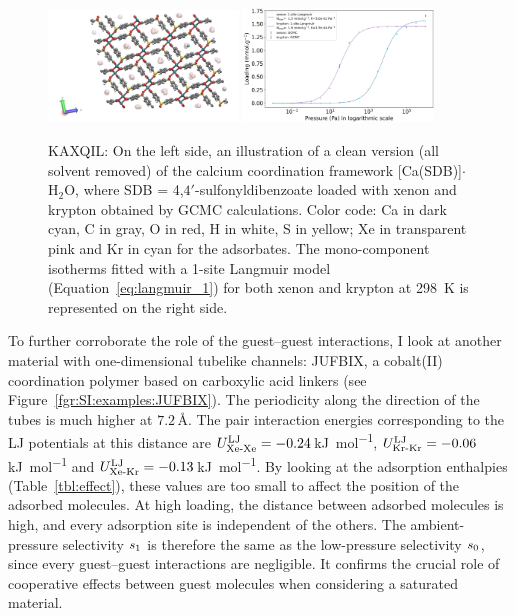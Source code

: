 \documentclass[main.tex]{subfiles}
\begin{document}
\begin{figure}[ht]
  \centering
    \includegraphics[width=0.45\textwidth]{figures/2-thermo/KAXQIL_clean.jpg}
    \includegraphics[width=0.45\textwidth]{figures/2-thermo/KAXQIL_clean_isotherm_xenon_krypton_298K.jpg}
    \caption{KAXQIL: On the left side, an illustration of a clean version (all solvent removed) of the calcium coordination framework [Ca(SDB)]$\cdot$H$_2$O, where SDB = 4,$4'$-sulfonyldibenzoate loaded with xenon and krypton obtained by GCMC calculations. Color code: Ca in dark cyan, C in gray, O in red, H in white, S in yellow; Xe in transparent pink and Kr in cyan for the adsorbates. The mono-component isotherms fitted with a 1-site Langmuir model (Equation~\ref{eq:langmuir_1}) for both xenon and krypton at \SI{298}{\kelvin} is represented on the right side.}\label{fgr:SI:examples:KAXQIL}
  \end{figure}

To further corroborate the role of the guest--guest interactions, I look at another material with one-dimensional tubelike channels: JUFBIX, a cobalt(II) coordination polymer based on carboxylic acid linkers (see Figure~\ref{fgr:SI:examples:JUFBIX}).\autocite{JUFBIX} The periodicity along the direction of the tubes is much higher at $7.2$\,\si{\angstrom}. The pair interaction energies corresponding to the LJ potentials at this distance are $U^{\text{LJ}}_{\text{Xe-Xe}}=-0.24$\,\si{\kilo\joule\per\mol}, $U^{\text{LJ}}_{\text{Kr-Kr}}=-0.06$\,\si{\kilo\joule\per\mol} and $U^{\text{LJ}}_{\text{Xe-Kr}}=-0.13$\,\si{\kilo\joule\per\mol}. By looking at the adsorption enthalpies (Table~\ref{tbl:effect}), these values are too small to affect the position of the adsorbed molecules. At high loading, the distance between adsorbed molecules is high, and every adsorption site is independent of the others. The ambient-pressure selectivity $s_{\text{1}}$ is therefore the same as the low-pressure selectivity $s_{\text{0}}$, since every guest--guest interactions are negligible. It confirms the crucial role of cooperative effects between guest molecules when considering a saturated material.
\end{document}
